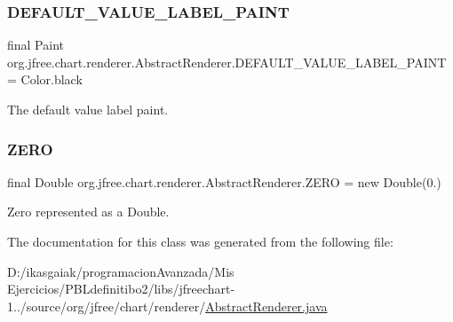 \subsubsection{\texorpdfstring{D\+E\+F\+A\+U\+L\+T\+\_\+\+V\+A\+L\+U\+E\+\_\+\+L\+A\+B\+E\+L\+\_\+\+P\+A\+I\+NT}{DEFAULT\_VALUE\_LABEL\_PAINT}}
{\footnotesize\ttfamily final Paint org.\+jfree.\+chart.\+renderer.\+Abstract\+Renderer.\+D\+E\+F\+A\+U\+L\+T\+\_\+\+V\+A\+L\+U\+E\+\_\+\+L\+A\+B\+E\+L\+\_\+\+P\+A\+I\+NT = Color.\+black\hspace{0.3cm}{\ttfamily [static]}}

The default value label paint. \mbox{\label{classorg_1_1jfree_1_1chart_1_1renderer_1_1_abstract_renderer_afe0614ba0ad7fd9591675c11382746aa}} 
\subsubsection{\texorpdfstring{Z\+E\+RO}{ZERO}}
{\footnotesize\ttfamily final Double org.\+jfree.\+chart.\+renderer.\+Abstract\+Renderer.\+Z\+E\+RO = new Double(0.)\hspace{0.3cm}{\ttfamily [static]}}

Zero represented as a {\ttfamily Double}. 

The documentation for this class was generated from the following file\+:\begin{DoxyCompactItemize}
\item 
D\+:/ikasgaiak/programacion\+Avanzada/\+Mis Ejercicios/\+P\+B\+Ldefinitibo2/libs/jfreechart-\/1../source/org/jfree/chart/renderer/\mbox{\hyperlink{_abstract_renderer_8java}{Abstract\+Renderer.\+java}}\end{DoxyCompactItemize}
